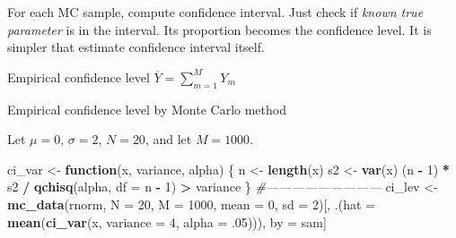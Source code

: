 \documentclass[]{book}
\newenvironment{Shaded}{\begin{snugshade}}{\end{snugshade}}
\newcommand{\CommentTok}[1]{\textcolor[rgb]{0.56,0.35,0.01}{\textit{#1}}}
\newcommand{\ControlFlowTok}[1]{\textcolor[rgb]{0.13,0.29,0.53}{\textbf{#1}}}
\newcommand{\DataTypeTok}[1]{\textcolor[rgb]{0.13,0.29,0.53}{#1}}
\newcommand{\DecValTok}[1]{\textcolor[rgb]{0.00,0.00,0.81}{#1}}
\newcommand{\FloatTok}[1]{\textcolor[rgb]{0.00,0.00,0.81}{#1}}
\newcommand{\KeywordTok}[1]{\textcolor[rgb]{0.13,0.29,0.53}{\textbf{#1}}}
\newcommand{\NormalTok}[1]{#1}
\newcommand{\OperatorTok}[1]{\textcolor[rgb]{0.81,0.36,0.00}{\textbf{#1}}}
\newcommand{\StringTok}[1]{\textcolor[rgb]{0.31,0.60,0.02}{#1}}
\theoremstyle{definition}
\theoremstyle{definition}
\theoremstyle{definition}
\theoremstyle{remark}
\begin{document}
For each MC sample, compute confidence interval. Just check if \emph{known true parameter} is in the interval. Its proportion becomes the confidence level. It is simpler that estimate confidence interval itself.

\begin{algorithm}[H] \label{alg:algcilev}
  \SetAlgoLined
  Empirical confidence level $\overline{Y} = \sum\limits_{m = 1}^M Y_m$\; \label{alg:cilevlast}
  \caption{Empirical confidence level by Monte Carlo method}
\end{algorithm}

Let \(\mu = 0\), \(\sigma = 2\), \(N = 20\), and let \(M = 1000\).

\begin{Shaded}
\begin{Highlighting}[]
\NormalTok{ci_var <-}\StringTok{ }\ControlFlowTok{function}\NormalTok{(x, variance, alpha) \{}
\NormalTok{  n <-}\StringTok{ }\KeywordTok{length}\NormalTok{(x)}
\NormalTok{  s2 <-}\StringTok{ }\KeywordTok{var}\NormalTok{(x)}
\NormalTok{  (n }\OperatorTok{-}\StringTok{ }\DecValTok{1}\NormalTok{) }\OperatorTok{*}\StringTok{ }\NormalTok{s2 }\OperatorTok{/}\StringTok{ }\KeywordTok{qchisq}\NormalTok{(alpha, }\DataTypeTok{df =}\NormalTok{ n }\OperatorTok{-}\StringTok{ }\DecValTok{1}\NormalTok{) }\OperatorTok{>}\StringTok{ }\NormalTok{variance}
\NormalTok{\}}
\CommentTok{#---------------------------}
\NormalTok{ci_lev <-}
\StringTok{  }\KeywordTok{mc_data}\NormalTok{(rnorm, }\DataTypeTok{N =} \DecValTok{20}\NormalTok{, }\DataTypeTok{M =} \DecValTok{1000}\NormalTok{, }\DataTypeTok{mean =} \DecValTok{0}\NormalTok{, }\DataTypeTok{sd =} \DecValTok{2}\NormalTok{)[,}
\NormalTok{                                                     .(}\DataTypeTok{hat =} \KeywordTok{mean}\NormalTok{(}\KeywordTok{ci_var}\NormalTok{(x, }\DataTypeTok{variance =} \DecValTok{4}\NormalTok{, }\DataTypeTok{alpha =} \FloatTok{.05}\NormalTok{))),}
\NormalTok{                                                     by =}\StringTok{ }\NormalTok{sam]}
\end{Highlighting}
\end{Shaded}
\end{document}

